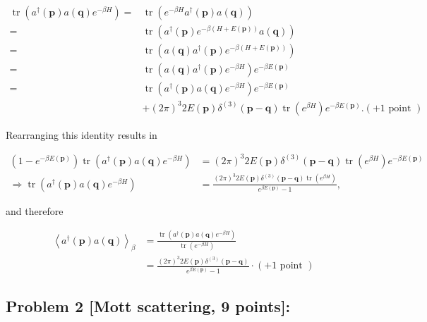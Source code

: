 \documentclass[10pt, letterpaper]{article}
\begin{document}
$$
\begin{aligned}
\operatorname{tr}\left(a^{\dagger}(\mathbf{p}) a(\mathbf{q}) e^{-\beta H}\right)= & \operatorname{tr}\left(e^{-\beta H} a^{\dagger}(\mathbf{p}) a(\mathbf{q})\right) \\
= & \operatorname{tr}\left(a^{\dagger}(\mathbf{p}) e^{-\beta(H+E(\mathbf{p}))} a(\mathbf{q})\right) \\
= & \operatorname{tr}\left(a(\mathbf{q}) a^{\dagger}(\mathbf{p}) e^{-\beta(H+E(\mathbf{p}))}\right) \\
= & \operatorname{tr}\left(a(\mathbf{q}) a^{\dagger}(\mathbf{p}) e^{-\beta H}\right) e^{-\beta E(\mathbf{p})} \\
= & \operatorname{tr}\left(a^{\dagger}(\mathbf{p}) a(\mathbf{q}) e^{-\beta H}\right) e^{-\beta E(\mathbf{p})} \\
& +(2 \pi)^3 2 E(\mathbf{p}) \delta^{(3)}(\mathbf{p}-\mathbf{q}) \operatorname{tr}\left(e^{\beta H}\right) e^{-\beta E(\mathbf{p})} .(+1 \text { point })
\end{aligned}
$$


Rearranging this identity results in

$$
\begin{aligned}
\left(1-e^{-\beta E(\mathbf{p})}\right) \operatorname{tr}\left(a^{\dagger}(\mathbf{p}) a(\mathbf{q}) e^{-\beta H}\right) & =(2 \pi)^3 2 E(\mathbf{p}) \delta^{(3)}(\mathbf{p}-\mathbf{q}) \operatorname{tr}\left(e^{\beta H}\right) e^{-\beta E(\mathbf{p})} \\
\Rightarrow \operatorname{tr}\left(a^{\dagger}(\mathbf{p}) a(\mathbf{q}) e^{-\beta H}\right) & =\frac{(2 \pi)^3 2 E(\mathbf{p}) \delta^{(3)}(\mathbf{p}-\mathbf{q}) \operatorname{tr}\left(e^{\beta H}\right)}{e^{\beta E(\mathbf{p})}-1},
\end{aligned}
$$

and therefore

$$
\begin{aligned}
\left\langle a^{\dagger}(\mathbf{p}) a(\mathbf{q})\right\rangle_\beta & =\frac{\operatorname{tr}\left(a^{\dagger}(\mathbf{p}) a(\mathbf{q}) e^{-\beta H}\right)}{\operatorname{tr}\left(e^{-\beta H}\right)} \\
& =\frac{(2 \pi)^3 2 E(\mathbf{p}) \delta^{(3)}(\mathbf{p}-\mathbf{q})}{e^{\beta E(\mathbf{p})}-1} \cdot(+1 \text { point })
\end{aligned}
$$


\subsection{Problem 2 [Mott scattering, 9 points]:}
\end{document}
